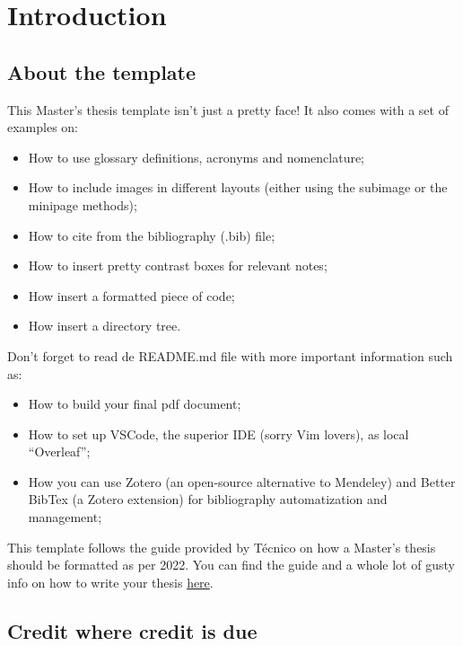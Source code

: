 \chapter{Introduction}
\label{chapter:introduction}

\section{About the template}

This Master's thesis template isn't just a pretty face! It also comes with a set of examples on:

\begin{itemize}
    \item How to use glossary definitions, acronyms and nomenclature;
    \item How to include images in different layouts (either using the subimage or the minipage methods);
    \item How to cite from the bibliography (.bib) file;
    \item How to insert pretty contrast boxes for relevant notes;
    \item How insert a formatted piece of code;
    \item How insert a directory tree.
\end{itemize}

Don't forget to read de README.md file with more important information such as:

\begin{itemize}
    \item How to build your final pdf document;
    \item How to set up VSCode, the superior IDE (sorry Vim lovers), as local ``Overleaf'';
    \item How you can use Zotero (an open-source alternative to Mendeley) and Better BibTex (a Zotero extension) for bibliography automatization and management;
\end{itemize}

This template follows the guide provided by Técnico on how a Master's thesis should be formatted as per 2022. You can find the guide and a whole lot of gusty info on how to write your thesis \href{https://tecnico.ulisboa.pt/en/education/study-at-tecnico/academic-information/masters-dissertation/}{here}.

\section{Credit where credit is due}

